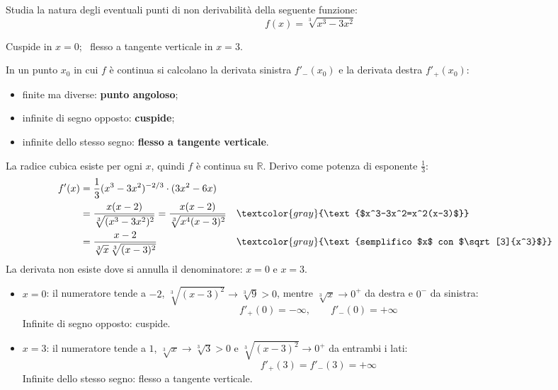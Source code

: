 \begin{question}[ID=1.1, subtitle={Punti di non derivabilità di $f(x)=\sqrt[3]{x^3-3x^2}$}, tags={non derivabilità, studio di funzione}, difficulty=media]
Studia la natura degli eventuali punti di non derivabilità della seguente funzione:
\begin{equation*}
    f(x) = \sqrt[3]{x^3-3x^2}
\end{equation*}
\begin{solution}
Cuspide in $x=0$; \ flesso a tangente verticale in $x=3$.
\end{solution}
\begin{explanation}
In un punto $x_0$ in cui $f$ è continua si calcolano la derivata sinistra $f'_-(x_0)$ e la derivata destra $f'_+(x_0)$:
\begin{itemize}
    \item finite ma diverse: \textbf{punto angoloso};
    \item infinite di segno opposto: \textbf{cuspide};
    \item infinite dello stesso segno: \textbf{flesso a tangente verticale}.
\end{itemize}
La radice cubica esiste per ogni $x$, quindi $f$ è continua su $\mathbb{R}$. Derivo come potenza di esponente $\tfrac13$:
\[\begin{aligned}
f'(x) &= \dfrac13(x^3-3x^2)^{-2/3}\cdot(3x^2-6x)\\
&= \dfrac{x(x-2)}{\sqrt[3]{(x^3-3x^2)^2}}=\dfrac{x(x-2)}{\sqrt[3]{x^4(x-3)^2}} && \textcolor{gray}{\text{$x^3-3x^2=x^2(x-3)$}}\\
&= \dfrac{x-2}{\sqrt[3]{x}\,\sqrt[3]{(x-3)^2}} && \textcolor{gray}{\text{semplifico $x$ con $\sqrt[3]{x^3}$}}
\end{aligned}\]
La derivata non esiste dove si annulla il denominatore: $x=0$ e $x=3$.
\begin{itemize}
    \item $x=0$: il numeratore tende a $-2$, $\sqrt[3]{(x-3)^2}\to\sqrt[3]9>0$, mentre $\sqrt[3]x\to0^+$ da destra e $0^-$ da sinistra:
    \[ f'_+(0)=-\infty, \qquad f'_-(0)=+\infty \]
    Infinite di segno opposto: cuspide.
    \item $x=3$: il numeratore tende a $1$, $\sqrt[3]x\to\sqrt[3]3>0$ e $\sqrt[3]{(x-3)^2}\to0^+$ da entrambi i lati:
    \[ f'_+(3)=f'_-(3)=+\infty \]
    Infinite dello stesso segno: flesso a tangente verticale.
\end{itemize}
\end{explanation}
\end{question}

